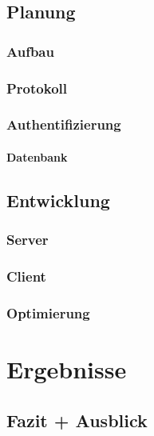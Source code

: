 \documentclass[a4paper,12pt,ngerman]{scrreport}
\begin{document}
    \section{Planung}
    \subsection{Aufbau}

    \subsection{Protokoll}

    \subsection{Authentifizierung}

    \subsubsection{Datenbank}

    \section{Entwicklung}
    \subsection{Server}
    \subsection{Client}
    \subsection{Optimierung}


    \chapter{Ergebnisse}

    \section{Fazit + Ausblick}
\end{document}
